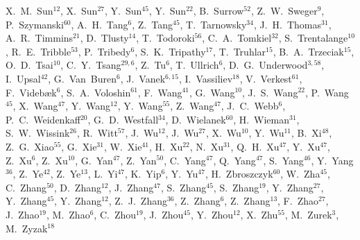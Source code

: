 {X.~M.~Sun$^{12}$,
X.~Sun$^{27}$,
Y.~Sun$^{45}$,
Y.~Sun$^{22}$,
B.~Surrow$^{52}$,
Z.~W.~Sweger$^{9}$,
P.~Szymanski$^{60}$,
A.~H.~Tang$^{6}$,
Z.~Tang$^{45}$,
T.~Tarnowsky$^{34}$,
J.~H.~Thomas$^{31}$,
A.~R.~Timmins$^{21}$,
D.~Tlusty$^{14}$,
T.~Todoroki$^{56}$,
C.~A.~Tomkiel$^{32}$,
S.~Trentalange$^{10}$,
R.~E.~Tribble$^{53}$,
P.~Tribedy$^{6}$,
S.~K.~Tripathy$^{17}$,
T.~Truhlar$^{15}$,
B.~A.~Trzeciak$^{15}$,
O.~D.~Tsai$^{10}$,
C.~Y.~Tsang$^{29,6}$,
Z.~Tu$^{6}$,
T.~Ullrich$^{6}$,
D.~G.~Underwood$^{3,58}$,
I.~Upsal$^{42}$,
G.~Van~Buren$^{6}$,
J.~Vanek$^{6,15}$,
I.~Vassiliev$^{18}$,
V.~Verkest$^{61}$,
F.~Videb{\ae}k$^{6}$,
S.~A.~Voloshin$^{61}$,
F.~Wang$^{41}$,
G.~Wang$^{10}$,
J.~S.~Wang$^{22}$,
P.~Wang$^{45}$,
X.~Wang$^{47}$,
Y.~Wang$^{12}$,
Y.~Wang$^{55}$,
Z.~Wang$^{47}$,
J.~C.~Webb$^{6}$,
P.~C.~Weidenkaff$^{20}$,
G.~D.~Westfall$^{34}$,
D.~Wielanek$^{60}$,
H.~Wieman$^{31}$,
S.~W.~Wissink$^{26}$,
R.~Witt$^{57}$,
J.~Wu$^{12}$,
J.~Wu$^{27}$,
X.~Wu$^{10}$,
Y.~Wu$^{11}$,
B.~Xi$^{48}$,
Z.~G.~Xiao$^{55}$,
G.~Xie$^{31}$,
W.~Xie$^{41}$,
H.~Xu$^{22}$,
N.~Xu$^{31}$,
Q.~H.~Xu$^{47}$,
Y.~Xu$^{47}$,
Z.~Xu$^{6}$,
Z.~Xu$^{10}$,
G.~Yan$^{47}$,
Z.~Yan$^{50}$,
C.~Yang$^{47}$,
Q.~Yang$^{47}$,
S.~Yang$^{46}$,
Y.~Yang$^{36}$,
Z.~Ye$^{42}$,
Z.~Ye$^{13}$,
L.~Yi$^{47}$,
K.~Yip$^{6}$,
Y.~Yu$^{47}$,
H.~Zbroszczyk$^{60}$,
W.~Zha$^{45}$,
C.~Zhang$^{50}$,
D.~Zhang$^{12}$,
J.~Zhang$^{47}$,
S.~Zhang$^{45}$,
S.~Zhang$^{19}$,
Y.~Zhang$^{27}$,
Y.~Zhang$^{45}$,
Y.~Zhang$^{12}$,
Z.~J.~Zhang$^{36}$,
Z.~Zhang$^{6}$,
Z.~Zhang$^{13}$,
F.~Zhao$^{27}$,
J.~Zhao$^{19}$,
M.~Zhao$^{6}$,
C.~Zhou$^{19}$,
J.~Zhou$^{45}$,
Y.~Zhou$^{12}$,
X.~Zhu$^{55}$,
M.~Zurek$^{3}$,
M.~Zyzak$^{18}$
}

\address{\rm{(STAR Collaboration)}}

